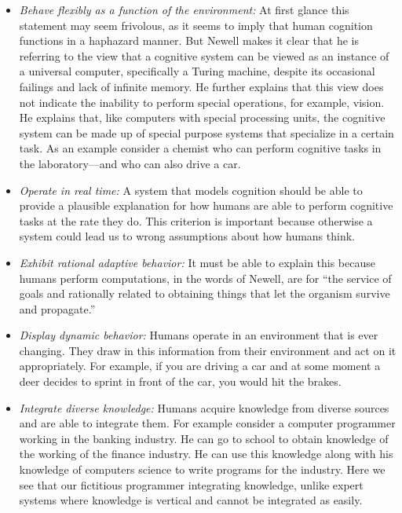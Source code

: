 \begin{itemize} 


\item {\em Behave flexibly as a function of the environment:} At first
  glance this statement may seem frivolous, as it seems to imply that
  human cognition functions in a haphazard manner. But Newell makes it
  clear that he is referring to the view that a cognitive system can
  be viewed as an instance of a universal computer, specifically a
  Turing machine, despite its occasional failings and lack of infinite
  memory. He further explains that this view does not indicate the
  inability to perform special operations, for example, vision. He
  explains that, like computers with special processing units, the
  cognitive system can be made up of special purpose systems that
  specialize in a certain task. As an example consider a chemist who
  can perform cognitive tasks in the laboratory---and who can also
  drive a car.

\item {\em Operate in real time:} A system that models cognition
  should be able to provide a plausible explanation for how humans are
  able to perform cognitive tasks at the rate they do. This criterion
  is important because otherwise a system could lead us to wrong
  assumptions about how humans think.

\item {\em Exhibit rational adaptive behavior:} It must be able to
  explain this because humans perform computations, in the words of
  Newell\cite{Newell:1990aa}, are for ``the service of goals and
  rationally related to obtaining things that let the organism survive
  and propagate.''

\item {\em Display dynamic behavior:} Humans operate in an
  environment that is ever changing. They draw in this information
  from their environment and act on it appropriately. For example, if
  you are driving a car and at some moment a deer decides to sprint in
  front of the car, you would hit the brakes.

\item {\em Integrate diverse knowledge:} Humans acquire knowledge from
diverse sources and are able to integrate them. For example consider a
computer programmer working in the banking industry. He can go to
school to obtain knowledge of the working of the finance industry. He
can use this knowledge along with his knowledge of computers science
to write programs for the industry. Here we see that our fictitious
programmer integrating knowledge, unlike expert systems where
knowledge is vertical and cannot be integrated as easily.


\end{itemize}
